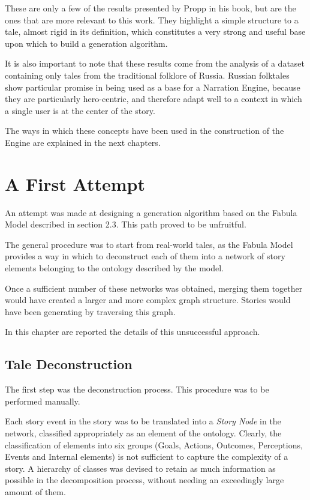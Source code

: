 \documentclass[12pt,a4paper,oneside]{report}
\begin{document}
\bigskip

These are only a few of the results presented by Propp in his book, but are the ones that are more relevant to this work. They highlight a simple structure to a tale, almost rigid in its definition, which constitutes a very strong and useful base upon which to build a generation algorithm.

It is also important to note that these results come from the analysis of a dataset containing only tales from the traditional folklore of Russia. Russian folktales show particular promise in being used as a base for a Narration Engine, because they are particularly hero-centric, and therefore adapt well to a context in which a single user is at the center of the story.  

The ways in which these concepts have been used in the construction of the Engine are explained in the next chapters. 

\pagebreak

\chapter{A First Attempt}
An attempt was made at designing a generation algorithm based on the Fabula Model described in section 2.3. This path proved to be unfruitful.

\bigskip

The general procedure was to start from real-world tales, as the Fabula Model provides a way in which to deconstruct each of them into a network of story elements belonging to the ontology described by the model. 

Once a sufficient number of these networks was obtained, merging them together would have created a larger and more complex graph structure. Stories would have been generating by traversing this graph.

In this chapter are reported the details of this unsuccessful approach.

\pagebreak

\section{Tale Deconstruction}

The first step was the deconstruction process. This procedure was to be performed manually.

Each story event in the story was  to be translated into a \textit{Story Node} in the network, classified appropriately as an element of the ontology. Clearly, the classification of elements into six groups (Goals, Actions, Outcomes, Perceptions, Events and Internal elements) is not sufficient to capture the complexity of a story. A hierarchy of classes was devised to retain as much information as possible in the decomposition process, without needing an exceedingly large amount of them.
\end{document}
